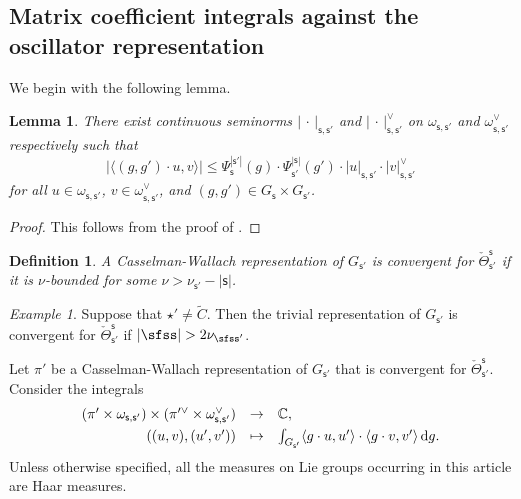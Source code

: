 \documentclass[12pt,a4paper]{amsart}
\def\abs#1{\left|{#1}\right|}
\newcommand{\od}{\operatorname{d}}
\newcommand{\la}{\langle}
\newcommand{\ra}{\rangle}
\newcommand{\be}{\begin {equation}}
\newcommand{\ee}{\end {equation}}
\numberwithin{equation}{section}
\newtheorem{lem}[thm]{Lemma}
\newtheorem{defn}[thm]{Definition}
\theoremstyle{remark}
\newtheorem*{Example}{Example}
\begin{document}
\subsection{Matrix coefficient integrals against the oscillator representation}



We begin with the following lemma.



\begin{lem}\label{matrico}
 There exist continuous seminorms $\abs{\,\cdot\,}_{\mathsf s, \mathsf s'}$ and $\abs{\,\cdot\,}_{\mathsf s, \mathsf s'}^\vee$ on  $ \omega_{\mathsf s, \mathsf s'}$ and $\omega_{\mathsf s, \mathsf s'}^\vee$ respectively such that
\[
 \abs{ \la (g,g')\cdot u, v\ra}\leq \Psi_{\mathsf s}^{\abs{\mathsf s'}}(g)\cdot \Psi_{\mathsf s'}^{\abs{\mathsf s}}(g')\cdot \abs{u}_{\mathsf s, \mathsf s'}\cdot \abs{v}_{\mathsf s, \mathsf s'}^\vee
\]
for all $u\in \omega_{\mathsf s, \mathsf s'}$, $v\in \omega_{\mathsf s, \mathsf s'}^\vee$, and $(g,g')\in G_{\mathsf s}\times G_{\mathsf s'}$.
\end{lem}
\begin{proof}
  This follows from the  proof of \cite[Theorem 3.2]{Li89}.
\end{proof}

 \begin{defn}\label{defn:CRcov}
A Casselman-Wallach representation of $G_{\mathsf s'}$ is convergent for $\check \Theta_{\mathsf s'}^{\mathsf s}$
if it is $\nu$-bounded for some $\nu>\nu_{\mathsf s'}-\abs{\mathsf s}$.
\end{defn}


\begin{Example}
Suppose that $\star'\neq \widetilde C$. Then the trivial representation of $G_{\mathsf s'}$ is convergent for $\check \Theta_{\mathsf s'}^{\mathsf s}$ if $\abs{\sfss}>2\nu_{\sfss'}$.

\end{Example}
Let $\pi'$ be a  Casselman-Wallach representation of $G_{\mathsf s'}$ that is convergent for $\check \Theta_{\mathsf s'}^{\mathsf s}$.
Consider the integrals
\be\label{convint00}
\begin{array}{rcl}
 (\pi' \times \omega_{\mathsf s, \mathsf s'})\times (\pi'^\vee \times \omega_{\mathsf s, \mathsf s'}^\vee )&\rightarrow &\C, \smallskip \\
   ((u,v),(u',v')) &\mapsto &\int_{G_{\mathsf s'}} \la g\cdot u, u'\ra\cdot \la g\cdot v, v'\ra \od\! g.
   \end{array}
 \ee
Unless otherwise specified, all the measures on Lie groups occurring  in this article are  Haar measures.
\end{document}
